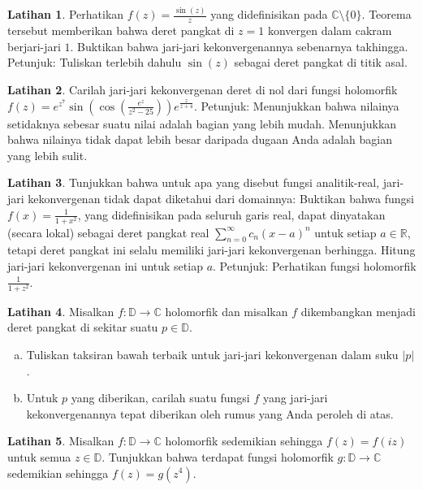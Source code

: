 \documentclass[12pt,openany]{book}
\newcommand{\sabs}[1]{\lvert {#1} \rvert}
\newcommand{\C}{{\mathbb{C}}}
\newcommand{\R}{{\mathbb{R}}}
\newcommand{\D}{{\mathbb{D}}}
\theoremstyle{plain}
\theoremstyle{remark}
\theoremstyle{definition}
\newenvironment{exbox}{%
    \def\FrameCommand{\vrule width 1pt \relax\hspace{10pt}}%
    \MakeFramed{\advance\hsize-\width\FrameRestore}%
}{%
    \endMakeFramed
}
\newenvironment{exparts}{%
    \leavevmode\begin{enumerate}[a),noitemsep,topsep=0pt,parsep=0pt,partopsep=0pt]
}{%
    \end{enumerate}
}
\theoremstyle{exercise}
\newtheorem{exercise}{Latihan}[section]
\theoremstyle{example}
\begin{document}
\begin{exbox}
\begin{exercise}
Perhatikan $f(z) = \frac{\sin(z)}{z}$ yang didefinisikan pada $\C \setminus \{ 0 \}$.
Teorema tersebut memberikan bahwa deret pangkat di $z=1$ konvergen dalam cakram berjari-jari
$1$.  Buktikan bahwa jari-jari kekonvergenannya sebenarnya takhingga.  Petunjuk:
Tuliskan terlebih dahulu $\sin(z)$ sebagai deret pangkat di titik asal.
\end{exercise}

\begin{exercise}
Carilah jari-jari kekonvergenan deret di nol dari fungsi holomorfik
$f(z) =
e^{z^7}\sin\left(\cos\left(\frac{e^z}{z^2-25}\right)\right)e^{\frac{z}{z+4}}$.
Petunjuk: Menunjukkan bahwa nilainya setidaknya sebesar suatu nilai adalah bagian yang lebih mudah.
Menunjukkan bahwa nilainya
tidak dapat lebih besar daripada dugaan Anda adalah bagian yang lebih sulit.
\end{exercise}

\begin{exercise}\label{exercise:realradconvhard}
\pagebreak[2]
Tunjukkan bahwa untuk apa yang disebut fungsi analitik-real, jari-jari
kekonvergenan tidak dapat diketahui dari domainnya:
Buktikan bahwa fungsi $f(x) = \frac{1}{1+x^2}$,
yang didefinisikan pada
seluruh garis real, dapat dinyatakan (secara lokal) sebagai deret pangkat real
$\sum_{n=0}^\infty c_n {(x-a)}^n$ untuk setiap $a \in \R$, tetapi
deret pangkat ini selalu memiliki jari-jari kekonvergenan berhingga.
Hitung jari-jari kekonvergenan ini untuk setiap $a$.  Petunjuk: Perhatikan
fungsi holomorfik $\frac{1}{1+z^2}$.
\end{exercise}

\begin{exercise}
Misalkan $f \colon \D \to \C$ holomorfik dan misalkan
$f$ dikembangkan menjadi deret pangkat di sekitar suatu $p \in \D$.
\begin{exparts}
\item
Tuliskan taksiran bawah terbaik untuk jari-jari kekonvergenan dalam suku
$\sabs{p}$.
\item
Untuk $p$ yang diberikan, carilah suatu fungsi $f$ yang jari-jari kekonvergenannya tepat
diberikan oleh rumus yang Anda peroleh di atas.
\end{exparts}
\end{exercise}

\begin{exercise}
Misalkan $f \colon \D \to \C$ holomorfik sedemikian sehingga
$f(z) = f(iz)$ untuk semua $z \in \D$.  Tunjukkan bahwa
terdapat fungsi holomorfik $g \colon \D \to \C$ sedemikian sehingga
$f(z) = g(z^4)$.
\end{exercise}


\end{exbox}
\end{document}

